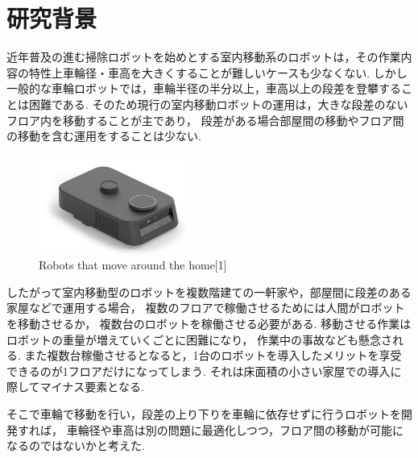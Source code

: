 \documentclass[dvipdfmx]{jsarticle}
\begin{document}

\section{研究背景}
近年普及の進む掃除ロボットを始めとする室内移動系のロボットは，その作業内容の特性上車輪径・車高を大きくすることが難しいケースも少なくない.
しかし一般的な車輪ロボットでは，車輪半径の半分以上，車高以上の段差を登攀することは困難である.
そのため現行の室内移動ロボットの運用は，大きな段差のないフロア内を移動することが主であり，
段差がある場合部屋間の移動やフロア間の移動を含む運用をすることは少ない.
\begin{figure}[H]
  \centering
  \includegraphics[width=50mm]{image/mn0201_kachaka_006}
  \caption{Robots that move around the home[1]}
  
  \label{fig:runba}
\end{figure}
したがって室内移動型のロボットを複数階建ての一軒家や，部屋間に段差のある家屋などで運用する場合，
複数のフロアで稼働させるためには人間がロボットを移動させるか，
複数台のロボットを稼働させる必要がある.
移動させる作業はロボットの重量が増えていくごとに困難になり，
作業中の事故なども懸念される.
また複数台稼働させるとなると，1台のロボットを導入したメリットを享受できるのが1フロアだけになってしまう.
それは床面積の小さい家屋での導入に際してマイナス要素となる.

そこで車輪で移動を行い，段差の上り下りを車輪に依存せずに行うロボットを開発すれば，
車輪径や車高は別の問題に最適化しつつ，フロア間の移動が可能になるのではないかと考えた.
\end{document}
